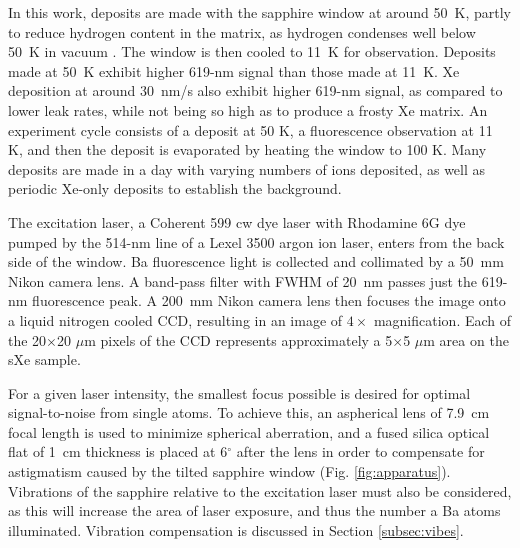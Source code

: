 \documentclass[aps,pra,reprint,superscriptaddress]{revtex4-1}
\begin{document}
In this work, deposits are made with the sapphire window at around 50~K, partly to reduce hydrogen content in the matrix, as hydrogen condenses well below 50~K in vacuum \cite{Mong2015}.  The window is then cooled to 11~K for observation.  Deposits made at 50~K exhibit higher 619-nm signal than those made at 11~K.  Xe deposition at around 30~nm/s also exhibit higher 619-nm signal, as compared to lower leak rates, while not being so high as to produce a frosty Xe matrix.  An experiment cycle consists of a deposit at 50 K, a fluorescence observation at 11 K, and then the deposit is evaporated by heating the window to 100 K.  Many deposits are made in a day with varying numbers of ions deposited, as well as periodic Xe-only deposits to establish the background.

The excitation laser, a Coherent 599 cw dye laser with Rhodamine 6G dye pumped by the 514-nm line of a Lexel 3500 argon ion laser, enters from the back side of the window.  Ba fluorescence light is collected and collimated by a 50~mm Nikon camera lens.  A band-pass filter with FWHM of 20~nm passes just the 619-nm fluorescence peak.  A 200~mm Nikon camera lens then focuses the image onto a liquid nitrogen cooled CCD, resulting in an image of $4 \times$ magnification.  Each of the 20$\times$20 $\mu$m pixels of the CCD represents approximately a 5$\times$5 $\mu$m area on the sXe sample.

For a given laser intensity, the smallest focus possible is desired for optimal signal-to-noise from single atoms.  To achieve this, an aspherical lens of 7.9~cm focal length \cite{asphere} is used to minimize spherical aberration, and a fused silica optical flat of 1~cm thickness is placed at 6$^{\circ}$ after the lens in order to compensate for astigmatism caused by the tilted sapphire window (Fig. \ref{fig:apparatus}).  Vibrations of the sapphire relative to the excitation laser must also be considered, as this will increase the area of laser exposure, and thus the number a Ba atoms illuminated.  Vibration compensation is discussed in Section \ref{subsec:vibes}. %
\end{document}
